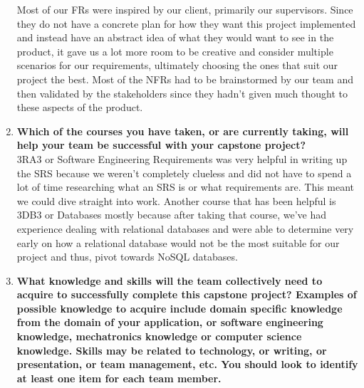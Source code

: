 \documentclass[12pt]{article}
\begin{document}
\begin{enumerate}
  Most of our FRs were inspired by our client, primarily our supervisors. Since they do not have a concrete plan for how they want this project implemented
  and instead have an abstract idea of what they would want to see in the product, it gave us a lot more room to be creative and consider multiple scenarios
  for our requirements, ultimately choosing the ones that suit our project the best. Most of the NFRs had to be brainstormed by our team and then validated by
  the stakeholders since they hadn't given much thought to these aspects of the product.
  \item \textbf{Which of the courses you have taken, or are currently taking, will help your team be successful with your capstone project?}\\

  3RA3 or Software Engineering Requirements was very helpful in writing up the SRS because we weren't completely clueless and did not have to spend a lot of time
  researching what an SRS is or what requirements are. This meant we could dive straight into work. Another course that has been helpful is 3DB3 or Databases mostly
  because after taking that course, we've had experience dealing with relational databases and were able to determine very early on how a relational database would
  not be the most suitable for our project and thus, pivot towards NoSQL databases.
  \item \textbf{What knowledge and skills will the team collectively need to acquire to
  successfully complete this capstone project?  Examples of possible knowledge
  to acquire include domain specific knowledge from the domain of your
  application, or software engineering knowledge, mechatronics knowledge or
  computer science knowledge.  Skills may be related to technology, or writing,
  or presentation, or team management, etc.  You should look to identify at
  least one item for each team member.}\\


\end{enumerate}
\end{document}
